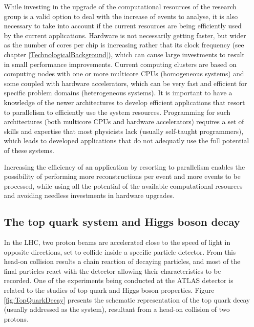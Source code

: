 While investing in the upgrade of the computational resources of the research group is a valid option to deal with the increase of events to analyse, it is also necessary to take into account if the current resources are being efficiently used by the current applications. Hardware is not necessarily getting faster, but wider as the number of cores per chip is increasing rather that its clock frequency (see chapter \ref{TechnologicalBackground}), which can cause large investments to result in small performance improvements. Current computing clusters are based on computing nodes with one or more multicore CPUs (homogeneous systems) and some coupled with hardware accelerators, which can be very fast and efficient for specific problem domains (heterogeneous systems). It is important to have a knowledge of the newer architectures to develop efficient applications that resort to parallelism to efficiently use the system resources. Programming for such architectures (both multicore CPUs and hardware accelerators) requires a set of skills and expertise that most physicists lack (usually self-taught programmers), which leads to developed applications that do not adequatly use the full potential of these systems.

Increasing the efficiency of an application by resorting to parallelism enables the possibility of performing more reconstructions per event and more events to be processed, while using all the potential of the available computational resources and avoiding needless investments in hardware upgrades.

\subsection{The top quark system and Higgs boson decay}
\label{TopQuarkSystem}

In the LHC, two proton beams are accelerated close to the speed of light in opposite directions, set to collide inside a specific particle detector. From this head-on collision results a chain reaction of decaying particles, and most of the final particles react with the detector allowing their characteristics to be recorded. One of the experiments being conducted at the ATLAS detector is related to the studies of top quark and Higgs boson properties. Figure \ref{fig:TopQuarkDecay} presents the schematic representation of the top quark decay (usually addressed as the \ttbar system), resultant from a head-on collision of two protons.

